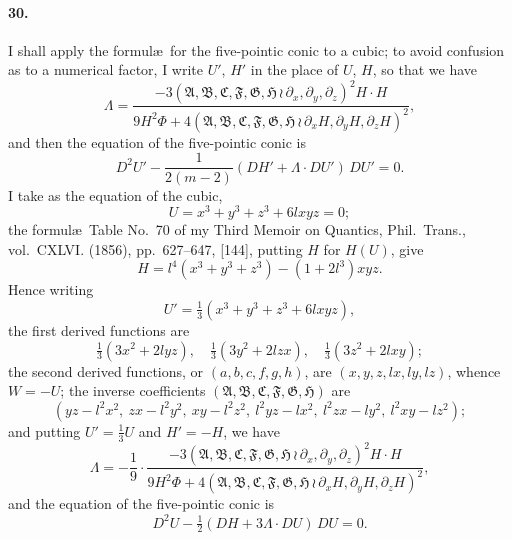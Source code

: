 \documentclass[11pt,a4paper]{book}
\begin{document}
\paragraph{30.}
I    shall   apply    the    formul\ae\  for   the    five-pointic    conic    to    a    cubic;    to    avoid
confusion  as  to  a  numerical  factor,  I  write  $U'$,  $H'$  in  the  place  of  $U$,  $H$,  so  that  we  have
\[
\Lambda = \frac{-3(\mathfrak{A}, \mathfrak{B}, \mathfrak{C}, \mathfrak{F}, \mathfrak{G}, \mathfrak{H} \,\!\!\wr\, \partial_x, \partial_y, \partial_z)^2 H \cdot H}{9H^2 \Phi + 4(\mathfrak{A}, \mathfrak{B}, \mathfrak{C}, \mathfrak{F}, \mathfrak{G}, \mathfrak{H} \,\!\!\wr\, \partial_x H, \partial_y H, \partial_z H)^2},
\]
and  then  the  equation  of  the  five-pointic  conic  is
\[
D^2 U' - \frac{1}{2(m-2)}(DH' + \Lambda \cdot DU') \, DU' = 0.
\]
I  take  as  the  equation  of  the  cubic,
\[
U = x^3 + y^3 + z^3 + 6lxyz = 0;
\]
the  formul\ae\  Table  No.~70   of  my  Third   Memoir  on    Quantics,  Phil.\ Trans.,   vol.~CXLVI.
(1856),  pp.~627--647,  [144],  putting  $H$  for  $H(U)$,  give
\[
H = l^4(x^3 + y^3 + z^3) - (1 + 2l^3) xyz.
\]
Hence  writing
\[
U' = \tfrac{1}{3}(x^3 + y^3 + z^3 + 6lxyz),
\]
the  first  derived  functions  are
\[
\tfrac{1}{3}(3x^2 + 2lyz), \quad \tfrac{1}{3}(3y^2 + 2lzx), \quad \tfrac{1}{3}(3z^2 + 2lxy);
\]
the  second  derived  functions,  or  $(a, b, c, f, g, h)$,  are  $(x, y, z, lx, ly, lz)$,  whence  $W = -U$;
the  inverse  coefficients  $(\mathfrak{A}, \mathfrak{B}, \mathfrak{C}, \mathfrak{F}, \mathfrak{G}, \mathfrak{H})$  are
\[
(yz - l^2x^2,\ zx - l^2y^2,\ xy - l^2z^2,\ l^2yz - lx^2,\ l^2zx - ly^2,\ l^2xy - lz^2);
\]
and  putting  $U' = \tfrac{1}{3}U$  and  $H' = -H$,  we  have
\[
\Lambda = -\frac{1}{9} \cdot \frac{-3(\mathfrak{A}, \mathfrak{B}, \mathfrak{C}, \mathfrak{F}, \mathfrak{G}, \mathfrak{H} \,\!\!\wr\, \partial_x, \partial_y, \partial_z)^2 H \cdot H}
               {9H^2 \Phi + 4(\mathfrak{A}, \mathfrak{B}, \mathfrak{C}, \mathfrak{F}, \mathfrak{G}, \mathfrak{H} \,\!\!\wr\, \partial_x H, \partial_y H, \partial_z H)^2},
\]
and  the  equation  of  the  five-pointic  conic  is
\[
D^2 U - \tfrac{1}{2}(DH + 3\Lambda \cdot DU) \, DU = 0.
\]
\end{document}
